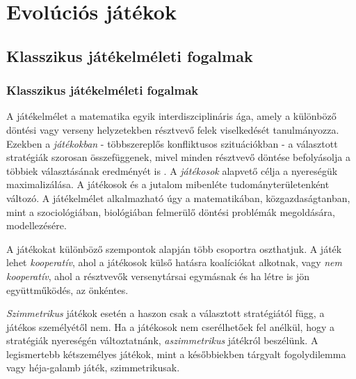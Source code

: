 \section{Evolúciós játékok}

\subsection{Klasszikus játékelméleti fogalmak}
\begin{frame}
\frametitle{Klasszikus játékelméleti fogalmak}
A játékelmélet a matematika egyik interdiszciplináris ága, amely a különböző döntési vagy verseny helyzetekben résztvevő felek viselkedését tanulmányozza. Ezekben a \textit{játékokban} - többszereplős konfliktusos szituációkban - a választott stratégiák szorosan összefüggenek, mivel minden résztvevő döntése befolyásolja a többiek választásának eredményét is \cite{wiki:gametheory}. A \textit{játékosok} alapvető célja a nyereségük maximalizálása. A játékosok és a jutalom mibenléte tudományterületenként változó. A játékelmélet alkalmazható úgy a matematikában, közgazdaságtanban, mint a  szociológiában, biológiában felmerülő döntési problémák megoldására, modellezésére.

A játékokat különböző szempontok alapján több csoportra oszthatjuk. A játék lehet \textit{kooperatív}, ahol a játékosok külső hatásra koalíciókat alkotnak, vagy \textit{nem kooperatív}, ahol a résztvevők versenytársai egymásnak és ha létre is jön együttműködés, az önkéntes. 

\textit{Szimmetrikus} játékok esetén a haszon csak a választott stratégiától függ, a játékos személyétől nem. Ha a játékosok nem cserélhetőek fel anélkül, hogy a stratégiák nyereségén változtatnánk, \textit{aszimmetrikus} játékról beszélünk. A legismertebb kétszemélyes játékok, mint a későbbiekben tárgyalt fogolydilemma vagy héja-galamb játék, szimmetrikusak.
\end{frame}

